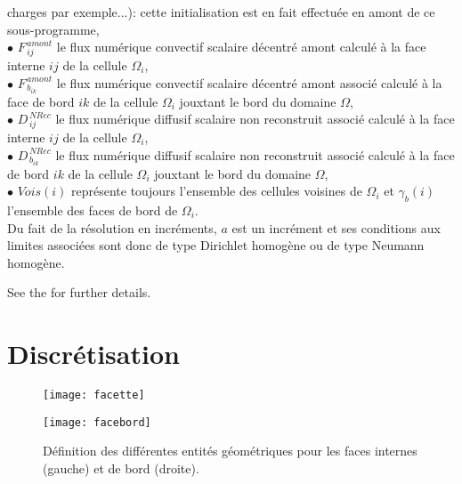 charges par exemple...): cette initialisation est en fait effectu\'ee en amont
de ce sous-programme, \\
$\bullet$ $F^{\,amont}_{\,ij}$ le flux num\'erique convectif scalaire
d\'ecentr\'e amont calcul\'e \`a la face interne $ij$ de la cellule $\Omega_i$,\\
$\bullet$ $F^{\,amont}_{\,b_{ik}}$ le flux num\'erique convectif scalaire
d\'ecentr\'e amont associ\'e calcul\'e \`a la face de bord $ik$ de la cellule $\Omega_i$
jouxtant le bord du domaine $\Omega$,\\
$\bullet$ $D^{\,NRec}_{\,ij}$ le flux num\'erique diffusif scalaire non
reconstruit associ\'e calcul\'e \`a la face interne $ij$ de la cellule $\Omega_i$,\\
$\bullet$ $D^{\,NRec}_{\,{b}_{ik}}$ le flux num\'erique diffusif scalaire non
reconstruit associ\'e calcul\'e \`a la face de bord $ik$ de la cellule $\Omega_i$ jouxtant le bord du domaine $\Omega$,\\
$\bullet$ $Vois(i)$ repr\'esente toujours l'ensemble des cellules
voisines de ${\Omega_i}$ et $\gamma_b(i)$ l'ensemble des faces de
bord de ${\Omega_i}$.\\
Du fait de la r\'esolution en incr\'ements, $a$ est un incr\'ement et ses
conditions aux limites associ\'ees sont donc de type Dirichlet homog\`ene ou de
type
Neumann homog\`ene.

See the  for further details.

\section*{Discr\'etisation}

\begin{figure}[h]
\parbox{8cm}{%
\centerline{\texttt{[image: facette]}}}
\parbox{8cm}{%
\centerline{\texttt{[image: facebord]}}}
\caption{\label{Base_Matrix_fig_geom_gradmc}D\'efinition des diff\'erentes entit\'es
g\'eom\'etriques pour les faces internes (gauche) et de bord (droite).}
\end{figure}

